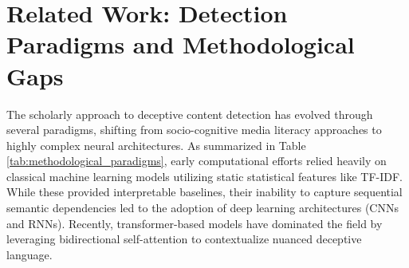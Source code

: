 \documentclass[informatics,article,accept,pdftex,moreauthors]{Definitions/mdpi}
\begin{document}
\section{Related Work: Detection Paradigms and Methodological Gaps}
The scholarly approach to deceptive content detection has evolved through several paradigms, shifting from socio-cognitive media literacy approaches to highly complex neural architectures. As summarized in Table \ref{tab:methodological_paradigms}, early computational efforts relied heavily on classical machine learning models utilizing static statistical features like TF-IDF. While these provided interpretable baselines, their inability to capture sequential semantic dependencies led to the adoption of deep learning architectures (CNNs and RNNs). Recently, transformer-based models have dominated the field by leveraging bidirectional self-attention to contextualize nuanced deceptive language. 
\end{document}
